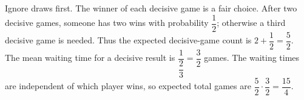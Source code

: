 Ignore draws first. The winner of each decisive game is a fair choice. After two decisive games, someone has two wins with probability $\dfrac{1}{2}$; otherwise a third decisive game is needed. Thus the expected decisive-game count is $2+\dfrac{1}{2}=\dfrac{5}{2}$. The mean waiting time for a decisive result is $\dfrac{1}{\dfrac{2}{3}}=\dfrac{3}{2}$ games. The waiting times are independent of which player wins, so expected total games are $\dfrac{5}{2}\cdot\dfrac{3}{2}=\boxed{\dfrac{15}{4}}$.
